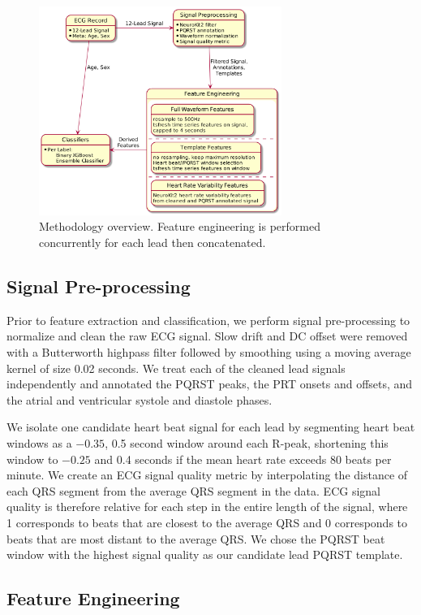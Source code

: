 \documentclass[twocolumn]{cinc}
\begin{document}
\begin{figure}[ht]
  \centering
  \includegraphics[width=7.9cm]{fig/methodology.png}
  \caption{Methodology overview. Feature engineering is performed concurrently for each lead then concatenated.}
  \label{fig:methodology}
\end{figure}

\subsection{Signal Pre-processing}

Prior to feature extraction and classification, we perform signal pre-processing to normalize and clean the raw ECG signal.
Slow drift and DC offset were removed with a Butterworth highpass filter followed by smoothing using a moving average kernel of size 0.02 seconds.
We treat each of the cleaned lead signals independently and annotated the PQRST peaks, the PRT onsets and offsets, and the atrial and ventricular systole and diastole phases.

We isolate one candidate heart beat signal for each lead by segmenting heart beat windows as a $-0.35$, 0.5 second window around each R-peak, shortening this window to $-0.25$ and 0.4 seconds if the mean heart rate exceeds 80 beats per minute.
We create an ECG signal quality metric by interpolating the distance of each QRS segment from the average QRS segment in the data.
ECG signal quality is therefore relative for each step in the entire length of the signal, where 1 corresponds to beats that are closest to the average QRS and 0 corresponds to beats that are most distant to the average QRS.
We chose the PQRST beat window with the highest signal quality as our candidate lead PQRST template.

\subsection{Feature Engineering}
\end{document}
